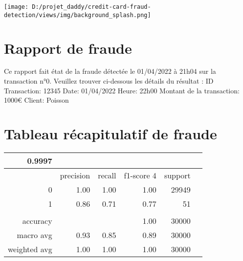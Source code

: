 \documentclass[10pt,a4paper]{article}
\begin{document}
\begin{center}
\texttt{[image: D:/projet\_daddy/credit-card-fraud-detection/views/img/background\_splash.png]} 
\end{center}
\section{Rapport de fraude}
\flushleft
\bigbreak  
\bigbreak  
Ce rapport fait état de la fraude détectée le 01/04/2022 à 21h04 sur la transaction n°0.
\bigbreak  
Veuillez trouver ci-dessous les détails du résultat :
\bigbreak  
ID Transaction: 12345
\bigbreak  
Date: 01/04/2022
\bigbreak  
Heure: 22h00
\bigbreak  
Montant de la transaction: 1000€
\bigbreak  
Client: Poisson
\bigbreak  
\section{Tableau récapitulatif de fraude}
\flushleft
\bigbreak  
\bigbreak  
\begin{center}
\begin{tabular}{| r | r | r | r | r | r | }
\hline
0.9997 & & & &\\
\hline
 & precision & recall & f1-score 4 & support\\
\hline
0 & 1.00 & 1.00 & 1.00 & 29949 \\
\hline
1 & 0.86 & 0.71 & 0.77 & 51\\
\hline
& & & &\\
\hline
accuracy &  & & 1.00 & 30000\\
\hline
macro avg & 0.93 & 0.85 & 0.89 & 30000\\
\hline
weighted avg & 1.00 & 1.00 & 1.00 & 30000\\
\hline

\end{tabular}
\end{center}
\end{document}
